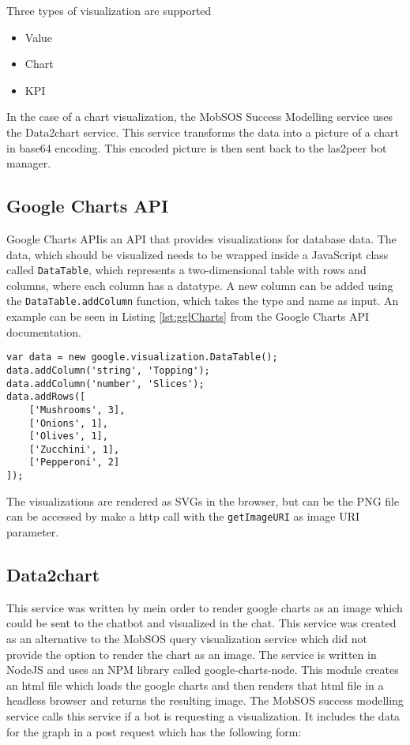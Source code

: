 Three types of visualization are supported
\begin{itemize}
    \item Value
    \item Chart
    \item KPI
\end{itemize}
In the case of a chart visualization, the MobSOS Success Modelling service uses the Data2chart service. This service transforms the data into a picture of a chart in base64 encoding. This encoded picture is then sent back to the las2peer bot manager.

\subsection{Google Charts API}
Google Charts API\footnotemark is an API that provides visualizations for database data. The data, which should be visualized needs to be wrapped inside a JavaScript class called \texttt{DataTable}, which represents a two-dimensional table with rows and columns, where each column has a datatype.
A new column can be added using the \texttt{DataTable.addColumn} function, which takes the type and name as input. An example can be seen in Listing \ref{lst:gglCharts} from the Google Charts API documentation\footnotemark[\value{footnote}].

\begin{lstlisting}[caption=Example use of the DataTable class,captionpos=b,label={lst:gglCharts}]
var data = new google.visualization.DataTable();
data.addColumn('string', 'Topping');
data.addColumn('number', 'Slices');
data.addRows([
	['Mushrooms', 3],
	['Onions', 1],
	['Olives', 1], 
	['Zucchini', 1],
	['Pepperoni', 2]
]);
\end{lstlisting}

The visualizations are rendered as SVGs in the browser, but can be the PNG file can be accessed by make a http call with the \texttt{getImageURI} as image URI parameter. 

\subsection{Data2chart}
This service was written by me\footnotemark in order to render google charts as an image which could be sent to the chatbot and visualized in the chat. This service was created as an alternative to the MobSOS query visualization service which did not provide the option to render the chart as an image. 
The service is written in NodeJS and uses an NPM library called google-charts-node\footnotemark.
This module creates an html file which loads the google charts and then renders that html file in a headless browser \footnotemark and returns the resulting image.
The MobSOS success modelling service calls this service if a bot is requesting a visualization. It includes the data for the graph in a post request which has the following form:

